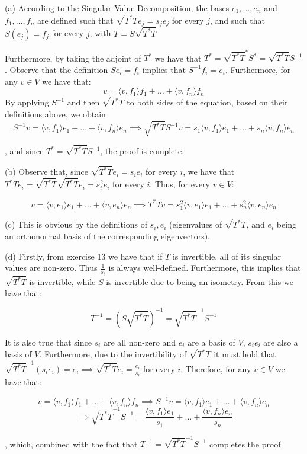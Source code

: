  \begin{solution}

     (a) According to the Singular Value Decomposition, the bases $e_1, \ldots, e_n$ and $f_1, \ldots, f_n$ are defined such that $\sqrt{T^*T}e_j = s_j e_j$ for every $j$, and such that $S(e_j) = f_j$ for every $j$, with $T = S \sqrt{T^*T}$

     Furthermore, by taking the adjoint of $T^*$ we have that $T^* = \sqrt{T^*T}^*S^* = \sqrt{T^*T}S^{-1}$. Observe that the definition $Se_i = f_i$ implies that $S^{-1}f_i = e_i$. Furthermore, for any $v \in V$ we have that:
     $$v = \langle v, f_1 \rangle f_1 + \ldots + \langle v, f_n \rangle f_n$$
     By applying $S^{-1}$ and then $\sqrt{T^*T}$ to both sides of the equation, based on their definitions above, we obtain $$S^{-1}v = \langle v, f_1 \rangle e_1 + \ldots + \langle v, f_n \rangle e_n \implies \sqrt{T^*T} S^{-1} v = s_1 \langle v, f_1 \rangle e_1 + \ldots + s_n\langle v, f_n \rangle e_n$$

     , and since $T^* = \sqrt{T^*T}S^{-1}$, the proof is complete.

     (b) Observe that, since $\sqrt{T^*T} e_i = s_i e_i$ for every $i$, we have that $T^*T e_i = \sqrt{T^*T} \sqrt{T^*T} e_i = s_i^2 e_i$ for every $i$. Thus, for every $v \in V$:

     $$v = \langle v, e_1 \rangle e_1 + \ldots + \langle v, e_n \rangle e_n \implies T^*T v = s_1^2 \langle v, e_1 \rangle e_1 + \ldots + s_n^2 \langle v, e_n \rangle e_n$$

     (c) This is obvious by the definitions of $s_i, e_i$ (eigenvalues of $\sqrt{T^*T}$, and $e_i$ being an orthonormal basis of the corresponding eigenvectors).

     (d) Firstly, from exercise 13 we have that if $T$ is invertible, all of its singular values are non-zero. Thus $\frac{1}{s_i}$ is always well-defined. Furthermore, this implies that $\sqrt{T^*T}$ is invertible, while $S$ is invertible due to being an isometry. From this we have that:

     $$T^{-1} = (S\sqrt{T^*T})^{-1} = \sqrt{T^*T}^{-1}S^{-1}$$

     It is also true that since $s_i$ are all non-zero and $e_i$ are a basis of $V$, $s_i e_i$ are also a basis of $V$. Furthermore, due to the invertibility of $\sqrt{T^*T}$ it must hold that $\sqrt{T^*T}^{-1}(s_i e_i) = e_i \implies \sqrt{T^*T} e_i = \frac{e_i}{s_i}$ for every $i$. Therefore, for any $v \in V$ we have that:

     $$v = \langle v, f_1 \rangle f_1 + \ldots + \langle v, f_n \rangle f_n \implies S^{-1} v = \langle v, f_1 \rangle e_1 + \ldots + \langle v, f_n \rangle e_n $$
     $$\implies \sqrt{T^*T}^{-1}S^{-1} = \frac{\langle v, f_1 \rangle e_1}{s_1} + \ldots + \frac{\langle v, f_n \rangle e_n}{s_n}$$

     , which, combined with the fact that $T^{-1} = \sqrt{T^*T}^{-1}S^{-1}$ completes the proof.
 \end{solution}

